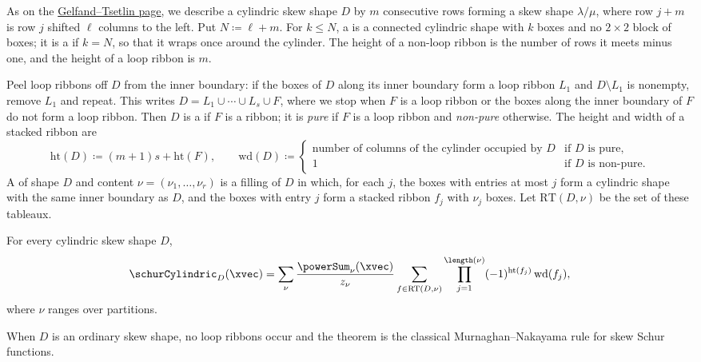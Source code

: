 As on the \hyperref[cylindricGTPatterns]{Gelfand--Tsetlin page}, we describe a
cylindric skew shape $D$ by $m$ consecutive rows forming a skew shape
$\lambda/\mu$, where row $j+m$ is row $j$ shifted $\ell$ columns to the left.
Put $N \coloneqq \ell+m$.
For $k \leq N$, a \label{cylindricRibbon} is a
connected cylindric shape with $k$ boxes and no $2\times 2$ block of boxes; it
is a \label{cylindricLoopRibbon} if $k=N$, so that it
wraps once around the cylinder.  The height of a non-loop ribbon is the number
of rows it meets minus one, and the height of a loop ribbon is $m$.

Peel loop ribbons off $D$ from the inner boundary: if the boxes of $D$ along
its inner boundary form a loop ribbon $L_1$ and $D\setminus L_1$ is nonempty,
remove $L_1$ and repeat.  This writes
$D = L_1 \cup \dotsb \cup L_s \cup F$, where we stop when $F$ is a loop ribbon
or the boxes along the inner boundary of $F$ do not form a loop ribbon.
Then $D$ is a \label{cylindricStackedRibbon} if $F$ is a
ribbon; it is \emph{pure} if $F$ is a loop ribbon and \emph{non-pure}
otherwise.  The height and width of a stacked ribbon are
\[
 \mathrm{ht}(D) \coloneqq (m+1)s + \mathrm{ht}(F),
 \qquad
 \mathrm{wd}(D) \coloneqq
 \begin{cases}
  \text{number of columns of the cylinder occupied by } D & \text{if $D$ is pure,}\\
  1 & \text{if $D$ is non-pure.}
 \end{cases}
\]
A \label{cylindricRibbonTableau} of shape $D$
and content $\nu=(\nu_1,\dotsc,\nu_r)$ is a filling of $D$ in which, for each
$j$, the boxes with entries at most $j$ form a cylindric shape with the same
inner boundary as $D$, and the boxes with entry $j$ form a stacked ribbon
$f_j$ with $\nu_j$ boxes.  Let $\mathrm{RT}(D,\nu)$ be the set of these
tableaux.

\begin{theorem}
\label{cylindricMurnaghanNakayamaRule}
For every cylindric skew shape $D$,
\[
\schurCylindric_D(\xvec) = \sum_{\nu} \frac{\powerSum_\nu(\xvec)}{z_\nu}
\sum_{f \in \mathrm{RT}(D,\nu)} \prod_{j=1}^{\length(\nu)}
(-1)^{\mathrm{ht}(f_j)} \, \mathrm{wd}(f_j),
\]
where $\nu$ ranges over partitions.
\end{theorem}

When $D$ is an ordinary skew shape, no loop ribbons occur and the theorem is
the classical Murnaghan--Nakayama rule for skew Schur functions.

